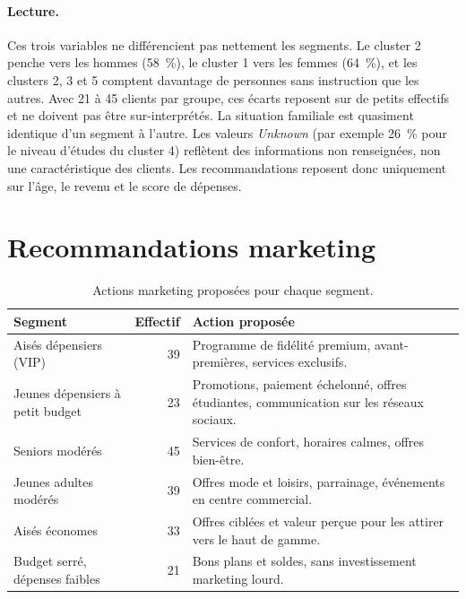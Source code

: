 \documentclass[11pt,a4paper]{article}
\begin{document}
\paragraph{Lecture.} Ces trois variables ne différencient pas nettement les segments. Le cluster 2 penche vers les hommes (58~\%), le cluster 1 vers les femmes (64~\%), et les clusters 2, 3 et 5 comptent davantage de personnes sans instruction que les autres. Avec 21 à 45 clients par groupe, ces écarts reposent sur de petits effectifs et ne doivent pas être sur-interprétés. La situation familiale est quasiment identique d'un segment à l'autre. Les valeurs \textit{Unknown} (par exemple 26~\% pour le niveau d'études du cluster 4) reflètent des informations non renseignées, non une caractéristique des clients. Les recommandations reposent donc uniquement sur l'âge, le revenu et le score de dépenses.

\section{Recommandations marketing}

\begin{table}[H]
\centering
\small
\begin{tabularx}{\textwidth}{@{}p{3.6cm}rX@{}}
\toprule
\textbf{Segment} & \textbf{Effectif} & \textbf{Action proposée}\\
\midrule
Aisés dépensiers (VIP) & 39 & Programme de fidélité premium, avant-premières, services exclusifs.\\
Jeunes dépensiers à petit budget & 23 & Promotions, paiement échelonné, offres étudiantes, communication sur les réseaux sociaux.\\
Seniors modérés & 45 & Services de confort, horaires calmes, offres bien-être.\\
Jeunes adultes modérés & 39 & Offres mode et loisirs, parrainage, événements en centre commercial.\\
Aisés économes & 33 & Offres ciblées et valeur perçue pour les attirer vers le haut de gamme.\\
Budget serré, dépenses faibles & 21 & Bons plans et soldes, sans investissement marketing lourd.\\
\bottomrule
\end{tabularx}
\caption{Actions marketing proposées pour chaque segment.}
\label{tab:reco}
\end{table}
\end{document}
